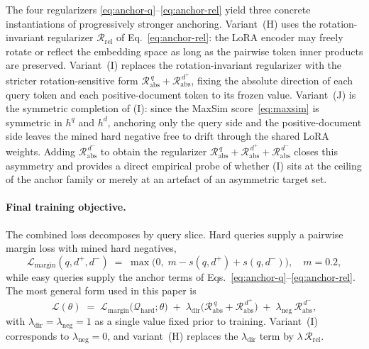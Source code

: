 The four regularizers \eqref{eq:anchor-q}--\eqref{eq:anchor-rel} yield three concrete instantiations of progressively stronger anchoring.
Variant~(H) uses the rotation-invariant regularizer $\mathcal{R}_{\text{rel}}$ of Eq.~\eqref{eq:anchor-rel}: the LoRA encoder may freely rotate or reflect the embedding space as long as the pairwise token inner products are preserved.
Variant~(I) replaces the rotation-invariant regularizer with the stricter rotation-sensitive form $\mathcal{R}_{\text{abs}}^{\,q} + \mathcal{R}_{\text{abs}}^{\,d^+}$, fixing the absolute direction of each query token and each positive-document token to its frozen value.
Variant~(J) is the symmetric completion of (I): since the MaxSim score~\eqref{eq:maxsim} is symmetric in $h^q$ and $h^d$, anchoring only the query side and the positive-document side leaves the mined hard negative free to drift through the shared LoRA weights. Adding $\mathcal{R}_{\text{abs}}^{\,d^-}$ to obtain the regularizer $\mathcal{R}_{\text{abs}}^{\,q} + \mathcal{R}_{\text{abs}}^{\,d^+} + \mathcal{R}_{\text{abs}}^{\,d^-}$ closes this asymmetry and provides a direct empirical probe of whether (I) sits at the ceiling of the anchor family or merely at an artefact of an asymmetric target set.

\paragraph{Final training objective.}
The combined loss decomposes by query slice. Hard queries supply a pairwise margin loss with mined hard negatives,
\begin{equation}
\mathcal{L}_{\text{margin}}(q, d^+, d^-) \;=\; \max\!\bigl(0,\; m - s(q, d^+) + s(q, d^-)\bigr),\quad m{=}0.2,
\label{eq:margin}
\end{equation}
while easy queries supply the anchor terms of Eqs.~\eqref{eq:anchor-q}--\eqref{eq:anchor-rel}. The most general form used in this paper is
\begin{equation}
\mathcal{L}(\theta) \;=\; \mathcal{L}_{\text{margin}}\bigl(\mathcal{Q}_{\text{hard}};\theta\bigr) \;+\; \lambda_{\text{dir}}\bigl(\mathcal{R}_{\text{abs}}^{\,q}+\mathcal{R}_{\text{abs}}^{\,d^+}\bigr) \;+\; \lambda_{\text{neg}}\,\mathcal{R}_{\text{abs}}^{\,d^-},
\label{eq:total}
\end{equation}
with $\lambda_{\text{dir}}=\lambda_{\text{neg}}=1$ as a single value fixed prior to training. Variant~(I) corresponds to $\lambda_{\text{neg}}=0$, and variant~(H) replaces the $\lambda_{\text{dir}}$ term by $\lambda\,\mathcal{R}_{\text{rel}}$.

